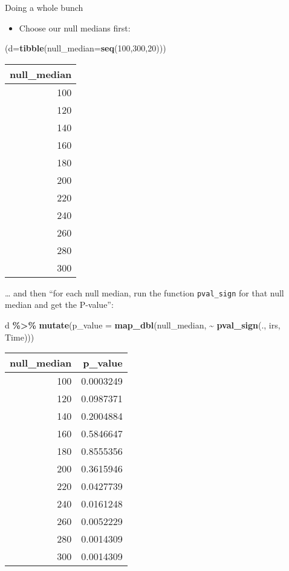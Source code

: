 \documentclass[
  ignorenonframetext,
]{beamer}
\newenvironment{Shaded}{\begin{snugshade}}{\end{snugshade}}
\newcommand{\DataTypeTok}[1]{\textcolor[rgb]{0.13,0.29,0.53}{#1}}
\newcommand{\DecValTok}[1]{\textcolor[rgb]{0.00,0.00,0.81}{#1}}
\newcommand{\KeywordTok}[1]{\textcolor[rgb]{0.13,0.29,0.53}{\textbf{#1}}}
\newcommand{\NormalTok}[1]{#1}
\newcommand{\OperatorTok}[1]{\textcolor[rgb]{0.81,0.36,0.00}{\textbf{#1}}}
\newcommand{\StringTok}[1]{\textcolor[rgb]{0.31,0.60,0.02}{#1}}
\providecommand{\tightlist}{%
  \setlength{\itemsep}{0pt}\setlength{\parskip}{0pt}}
\begin{document}
\begin{frame}[fragile]{Doing a whole bunch}
\protect\hypertarget{doing-a-whole-bunch}{}
\begin{itemize}
\tightlist
\item
  Choose our null medians first:
\end{itemize}

\small

\begin{Shaded}
\begin{Highlighting}[]
\NormalTok{(}\DataTypeTok{d=}\KeywordTok{tibble}\NormalTok{(}\DataTypeTok{null\_median=}\KeywordTok{seq}\NormalTok{(}\DecValTok{100}\NormalTok{,}\DecValTok{300}\NormalTok{,}\DecValTok{20}\NormalTok{)))}
\end{Highlighting}
\end{Shaded}

\begin{longtable}[]{@{}r@{}}
\toprule
null\_median\tabularnewline
\midrule
\endhead
100\tabularnewline
120\tabularnewline
140\tabularnewline
160\tabularnewline
180\tabularnewline
200\tabularnewline
220\tabularnewline
240\tabularnewline
260\tabularnewline
280\tabularnewline
300\tabularnewline
\bottomrule
\end{longtable}

\normalsize
\end{frame}

\begin{frame}[fragile]{\ldots{} and then}
\protect\hypertarget{and-then}{}
``for each null median, run the function \texttt{pval\_sign} for that
null median and get the P-value'':

\begin{Shaded}
\begin{Highlighting}[]
\NormalTok{d }\OperatorTok{\%\textgreater{}\%}\StringTok{ }\KeywordTok{mutate}\NormalTok{(}\DataTypeTok{p\_value =} \KeywordTok{map\_dbl}\NormalTok{(null\_median, }
                               \OperatorTok{\textasciitilde{}}\StringTok{ }\KeywordTok{pval\_sign}\NormalTok{(., irs, Time)))}
\end{Highlighting}
\end{Shaded}

\begin{longtable}[]{@{}rr@{}}
\toprule
null\_median & p\_value\tabularnewline
\midrule
\endhead
100 & 0.0003249\tabularnewline
120 & 0.0987371\tabularnewline
140 & 0.2004884\tabularnewline
160 & 0.5846647\tabularnewline
180 & 0.8555356\tabularnewline
200 & 0.3615946\tabularnewline
220 & 0.0427739\tabularnewline
240 & 0.0161248\tabularnewline
260 & 0.0052229\tabularnewline
280 & 0.0014309\tabularnewline
300 & 0.0014309\tabularnewline
\bottomrule
\end{longtable}
\end{frame}
\end{document}
